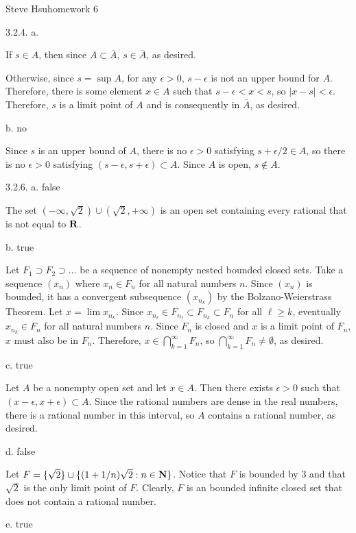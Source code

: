 \def\abs#1{\vert#1\vert}
\def\real{{\bf R}}
\def\natural{{\bf N}}
\centerline{Steve Hsu\hfill homework 6}
\item{3.2.4.} a.

If $s \in A$, then since $A \subset \overline A$,
$s \in \overline A$, as desired.

Otherwise, since $s = \sup A$, for any $\epsilon > 0$,
$s - \epsilon$ is not an upper bound for $A$.
Therefore, there is some element $x \in A$ such that
$s - \epsilon < x < s$, so $\abs{x - s} < \epsilon$.
Therefore, $s$ is a limit point of $A$
and is consequently in $\overline A$, as desired.
\medskip
\item{} b. no

Since $s$ is an upper bound of $A$,
there is no $\epsilon > 0$ satisfying
$s + \epsilon/2 \in A$,
so there is no $\epsilon > 0$ satisfying
$(s - \epsilon, s + \epsilon) \subset A$.
Since $A$ is open, $s \notin A$.
\bigskip
\item{3.2.6.} a. false

The set $(-\infty,\sqrt 2) \cup (\sqrt 2, +\infty)$
is an open set containing every rational
that is not equal to $\real$.
\medskip
\item{} b. true

Let $F_1 \supset F_2 \supset \ldots$ be a sequence of
nonempty nested bounded closed sets.
Take a sequence $(x_n)$ where $x_n \in F_n$ for all natural numbers $n$.
Since $(x_n)$ is bounded, it has a convergent subsequence $(x_{n_k})$
by the Bolzano-Weierstrass Theorem.
Let $x = \lim x_{n_k}$.
Since $x_{n_\ell} \in F_{n_\ell} \subset F_{n_k} \subset F_n$
for all $\ell \ge k$,
eventually $x_{n_k} \in F_n$ for all natural numbers $n$.
Since $F_n$ is closed and $x$ is a limit point of $F_n$,
$x$ must also be in $F_n$.
Therefore, $x \in \bigcap _{k=1} ^\infty F_n$, so
$\bigcap _{k=1} ^\infty F_n \ne \emptyset$, as desired.
\medskip
\item{} c. true

Let $A$ be a nonempty open set and let $x \in A$.
Then there exists $\epsilon > 0$ such that
$(x - \epsilon, x + \epsilon) \subset A$.
Since the rational numbers are dense in the real numbers,
there is a rational number in this interval,
so $A$ contains a rational number, as desired.
\medskip
\item{} d. false

Let $F = \{\sqrt 2\} \cup \{(1 + 1/n)\sqrt 2: n \in \natural\}$.
Notice that $F$ is bounded by $3$
and that $\sqrt 2$ is the only limit point of $F$.
Clearly, $F$ is an bounded infinite closed set
that does not contain a rational number.
\medskip
\item{} e. true

